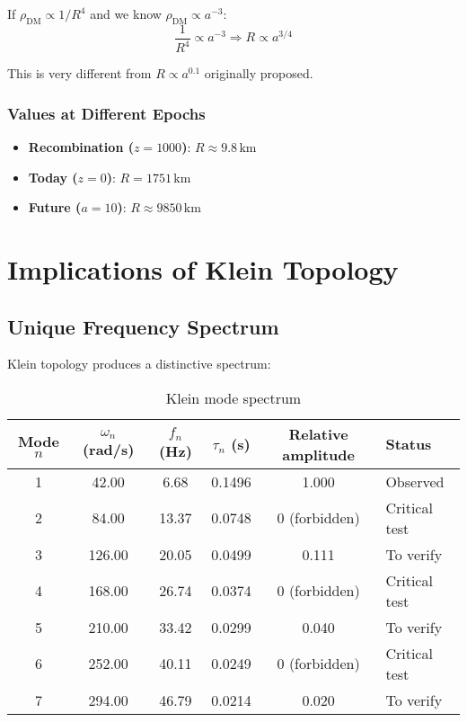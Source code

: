 \documentclass[12pt,a4paper]{article}
\begin{document}
If $\rho_\mathrm{DM} \propto 1/R^4$ and we know $\rho_\mathrm{DM} \propto a^{-3}$:
\begin{equation}
\frac{1}{R^4} \propto a^{-3} \Rightarrow R \propto a^{3/4}
\end{equation}

This is very different from $R \propto a^{0.1}$ originally proposed.

\subsubsection{Values at Different Epochs}

\begin{itemize}
    \item \textbf{Recombination ($z=1000$)}: $R \approx 9.8\,\mathrm{km}$
    \item \textbf{Today ($z=0$)}: $R = 1751\,\mathrm{km}$
    \item \textbf{Future ($a=10$)}: $R \approx 9850\,\mathrm{km}$
\end{itemize}

\section{Implications of Klein Topology}
\label{sec:klein}

\subsection{Unique Frequency Spectrum}

Klein topology produces a distinctive spectrum:

\begin{table}[H]
\centering
\caption{Klein mode spectrum}
\label{tab:spectrum}
\begin{tabular}{cccccl}
\toprule
Mode $n$ & $\omega_n$ (rad/s) & $f_n$ (Hz) & $\tau_n$ (s) & Relative amplitude & Status \\
\midrule
1 & 42.00 & 6.68 & 0.1496 & 1.000 & Observed \\
2 & 84.00 & 13.37 & 0.0748 & 0 (forbidden) & Critical test \\
3 & 126.00 & 20.05 & 0.0499 & 0.111 & To verify \\
4 & 168.00 & 26.74 & 0.0374 & 0 (forbidden) & Critical test \\
5 & 210.00 & 33.42 & 0.0299 & 0.040 & To verify \\
6 & 252.00 & 40.11 & 0.0249 & 0 (forbidden) & Critical test \\
7 & 294.00 & 46.79 & 0.0214 & 0.020 & To verify \\
\bottomrule
\end{tabular}
\end{table}
\end{document}
